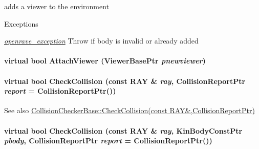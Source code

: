 adds a viewer to the environment 


\begin{DoxyExceptions}{Exceptions}
\item[{\em \hyperlink{classOpenRAVE_1_1openrave__exception}{openrave\_\-exception}}]Throw if body is invalid or already added \end{DoxyExceptions}
\hypertarget{classOpenRAVE_1_1EnvironmentBase_a90f75894de7b1b01e9a2e16021ac3f7d}{
\paragraph[{AttachViewer}]{\setlength{\rightskip}{0pt plus 5cm}virtual bool AttachViewer (ViewerBasePtr {\em pnewviewer})}\hfill}
\label{classOpenRAVE_1_1EnvironmentBase_a90f75894de7b1b01e9a2e16021ac3f7d}
\hypertarget{classOpenRAVE_1_1EnvironmentBase_a4c0906fc2d591ac8940c55ad5a16969f}{
\paragraph[{CheckCollision}]{\setlength{\rightskip}{0pt plus 5cm}virtual bool CheckCollision (const {\bf RAY} \& {\em ray}, \/  CollisionReportPtr {\em report} = {\ttfamily CollisionReportPtr()})}\hfill}
\label{classOpenRAVE_1_1EnvironmentBase_a4c0906fc2d591ac8940c55ad5a16969f}
\begin{DoxySeeAlso}{See also}
\hyperlink{classOpenRAVE_1_1CollisionCheckerBase_a4c0906fc2d591ac8940c55ad5a16969f}{CollisionCheckerBase::CheckCollision(const RAY\&,CollisionReportPtr)} 
\end{DoxySeeAlso}
\hypertarget{classOpenRAVE_1_1EnvironmentBase_a91d971fb7be4e4b653fd02ee9bd6528c}{
\paragraph[{CheckCollision}]{\setlength{\rightskip}{0pt plus 5cm}virtual bool CheckCollision (const {\bf RAY} \& {\em ray}, \/  KinBodyConstPtr {\em pbody}, \/  CollisionReportPtr {\em report} = {\ttfamily CollisionReportPtr()})}\hfill}
